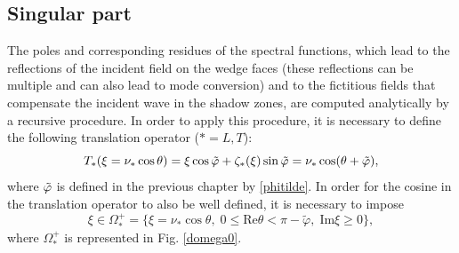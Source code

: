 \subsection{Singular part}
\label{C3:singpart}
The poles and corresponding residues of the spectral functions, which lead to the reflections of the incident field on the wedge faces (these reflections can be multiple and can also lead to mode conversion) and to the fictitious fields that compensate the incident wave in the shadow zones, are computed analytically by a recursive procedure. In order to apply this procedure, it is necessary to define the following translation operator ($*=L,T$):
\begin{equation}
T_*(\xi=\nu_*\cos\theta)=\xi \cos \tilde{\varphi}+\zeta_*(\xi)\sin\tilde{\varphi}=\nu_*\cos(\theta+\tilde{\varphi}),
\end{equation}
where $\tilde{\varphi}$ is defined in the previous chapter by \eqref{phitilde}. 
In order for the cosine in the translation operator to also be well defined, it is necessary to impose
\begin{equation}
\xi \in \Omega_*^+= \{ \xi=\nu_* \cos \theta, \; 0 \leq \mbox{Re} \theta < \pi-\tilde{\varphi}, \; \mbox{Im}\xi\geq0 \},
\label{defOmega0}
\end{equation}
where $\Omega_*^+$ is represented in Fig. \ref{domega0}.

